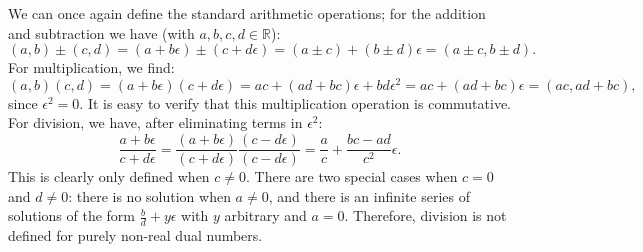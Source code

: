 We can once again define the standard arithmetic operations; for the addition and subtraction we have (with $a,b,c,d\in\mathbb{R}$):
\begin{equation}
	(a,b)\pm(c,d) = (a+b\epsilon) \pm (c+d\epsilon) = (a\pm c)+(b \pm d)\epsilon = (a\pm c,b\pm d). 
\end{equation}
For multiplication, we find:
\begin{equation}
	(a,b)(c,d) = (a+b\epsilon)(c+d\epsilon) = ac+(ad+bc)\epsilon + bd\epsilon^2 = ac+(ad+bc)\epsilon = (ac,ad+bc),
\end{equation}
since $\epsilon^2=0$.  It is easy to verify that this multiplication operation is commutative.  For division, we have, after eliminating terms in $\epsilon^2$:
\begin{equation}
	\frac{a+b\epsilon}{c+d\epsilon} = \frac{(a+b\epsilon)}{(c+d\epsilon)}\frac{(c-d\epsilon)}{(c-d\epsilon)}= \frac{a}{c} + \frac{bc-ad}{c^2}\epsilon.
\end{equation}
This is clearly only defined when $c\ne 0$.  There are two special cases when $c=0$ and $d\ne 0$: there is no solution when $a\ne 0$, and there is an infinite series of solutions of the form $\frac{b}{d}+y\epsilon$ with $y$ arbitrary and $a=0$. Therefore, division is not defined for purely non-real dual numbers.  

